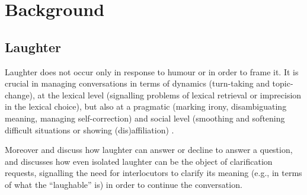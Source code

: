 \documentclass[11pt,a4paper]{article}
\begin{document}
\section{Background}
\label{sec:background}

\subsection{Laughter}
\label{sec:laughter}
Laughter does not occur only in
response to humour or in order to frame it. It is crucial in managing conversations in terms of dynamics (turn-taking and
topic-change), at the lexical level (signalling problems of lexical retrieval or
imprecision in the lexical choice), but also at a pragmatic (marking irony,
disambiguating meaning, managing self-correction) and social level (smoothing and softening difficult situations or showing
(dis)affiliation)
\citep{glenn2003laughter,jefferson1984organization,mazzocconi2019phd,petitjean2015laughing}.

Moreover \citet{romaniuk2009clinton} and \citet{ginzburg2020laughter}
discuss how laughter can answer or decline to answer a question, and
\citet{mazzocconi2018laughter} discusses how even isolated laughter
can be the object of clarification requests, signalling the need for
interlocutors to clarify its meaning (e.g., in terms of what the
``laughable'' is) in order to continue the conversation.


\end{document}
